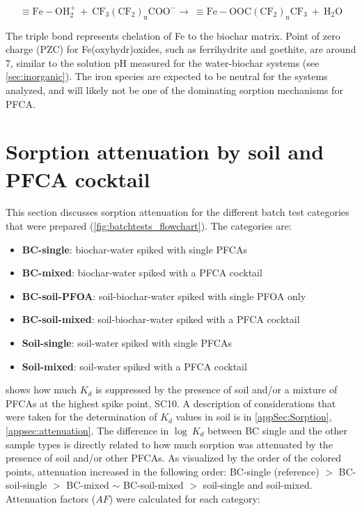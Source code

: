 \begin{equation}
    \mathrm{\equiv Fe-OH_2^+ ~ + ~ CF_3(CF_2)_nCOO^- \rightarrow ~ \equiv Fe-OOC(CF_2)_nCF_3 ~+~ H_2O}
\end{equation}

The triple bond represents chelation of Fe to the biochar matrix. Point of zero charge (PZC) for Fe(oxyhydr)oxides, such as ferrihydrite and goethite, are around 7, similar to the solution pH measured for the water-biochar systems (see \cref{sec:inorganic}). The iron species are expected to be neutral for the systems analyzed, and will likely not be one of the dominating sorption mechanisms for PFCA. 


\section{Sorption attenuation by soil and PFCA cocktail}
This section discusses sorption attenuation for the different batch test categories that were prepared (\cref{fig:batchtests_flowchart}). The categories are: 

\begin{itemize}
    \item \textbf{BC-single}: biochar-water spiked with single PFCAs
    \item \textbf{BC-mixed}: biochar-water spiked with a PFCA cocktail
    \item \textbf{BC-soil-PFOA}: soil-biochar-water spiked with single PFOA only
    \item \textbf{BC-soil-mixed}: soil-biochar-water spiked with a PFCA cocktail
    \item \textbf{Soil-single}: soil-water spiked with single PFCAs
    \item \textbf{Soil-mixed}: soil-water spiked with a PFCA cocktail
\end{itemize}

 shows how much $K_d$ is suppressed by the presence of soil and/or a mixture of PFCAs at the highest spike point, SC10. A description of considerations that were taken for the determination of $K_d$ values in soil is in \cref{appSec:Sorption}, \cref{appsec:attenuation}. The difference in $\log~K_d$ between BC single and the other sample types is directly related to how much sorption was attenuated by the presence of soil and/or other PFCAs. As visualized by the order of the colored points, attenuation increased in the following order: BC-single (reference) $>$ BC-soil-single $>$ BC-mixed $\sim$ BC-soil-mixed $>$ soil-single and soil-mixed. Attenuation factors ($AF$) were calculated for each category:

